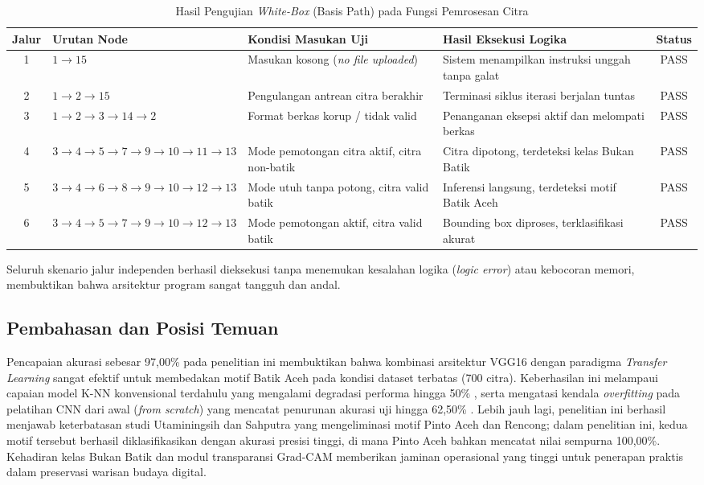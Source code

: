 \documentclass[10pt,a4paper]{article}
\begin{document}
\begin{table}[htbp]
  \centering
  \caption{Hasil Pengujian \textit{White-Box} (Basis Path) pada Fungsi Pemrosesan Citra}
  \label{tab:whitebox}
  \fontsize{8pt}{10pt}\selectfont
  \begin{tabularx}{\textwidth}{cp{4.0cm}XXc}
    \toprule
    \textbf{Jalur} & \textbf{Urutan Node} & \textbf{Kondisi Masukan Uji} & \textbf{Hasil Eksekusi Logika} & \textbf{Status} \\
    \midrule
    1 & $1 \to 15$ & Masukan kosong (\textit{no file uploaded}) & Sistem menampilkan instruksi unggah tanpa galat & PASS \\
    2 & $1 \to 2 \to 15$ & Pengulangan antrean citra berakhir & Terminasi siklus iterasi berjalan tuntas & PASS \\
    3 & $1 \to 2 \to 3 \to 14 \to 2$ & Format berkas korup / tidak valid & Penanganan eksepsi aktif dan melompati berkas & PASS \\
    4 & $3 \to 4 \to 5 \to 7 \to 9 \to 10 \to 11 \to 13$ & Mode pemotongan citra aktif, citra non-batik & Citra dipotong, terdeteksi kelas Bukan Batik & PASS \\
    5 & $3 \to 4 \to 6 \to 8 \to 9 \to 10 \to 12 \to 13$ & Mode utuh tanpa potong, citra valid batik & Inferensi langsung, terdeteksi motif Batik Aceh & PASS \\
    6 & $3 \to 4 \to 5 \to 7 \to 9 \to 10 \to 12 \to 13$ & Mode pemotongan aktif, citra valid batik & Bounding box diproses, terklasifikasi akurat & PASS \\
    \bottomrule
  \end{tabularx}
\end{table}

Seluruh skenario jalur independen berhasil dieksekusi tanpa menemukan kesalahan logika (\textit{logic error}) atau kebocoran memori, membuktikan bahwa arsitektur program sangat tangguh dan andal.

\subsection{Pembahasan dan Posisi Temuan}
Pencapaian akurasi sebesar 97,00\% pada penelitian ini membuktikan bahwa kombinasi arsitektur VGG16 dengan paradigma \textit{Transfer Learning} sangat efektif untuk membedakan motif Batik Aceh pada kondisi dataset terbatas (700 citra). Keberhasilan ini melampaui capaian model K-NN konvensional terdahulu yang mengalami degradasi performa hingga 50\% \cite{fajira2022}, serta mengatasi kendala \textit{overfitting} pada pelatihan CNN dari awal (\textit{from scratch}) yang mencatat penurunan akurasi uji hingga 62,50\% \cite{azmi2023}. Lebih jauh lagi, penelitian ini berhasil menjawab keterbatasan studi Utaminingsih dan Sahputra \cite{utaminingsih2024} yang mengeliminasi motif Pinto Aceh dan Rencong; dalam penelitian ini, kedua motif tersebut berhasil diklasifikasikan dengan akurasi presisi tinggi, di mana Pinto Aceh bahkan mencatat nilai sempurna 100,00\%. Kehadiran kelas Bukan Batik dan modul transparansi Grad-CAM memberikan jaminan operasional yang tinggi untuk penerapan praktis dalam preservasi warisan budaya digital.
\end{document}
